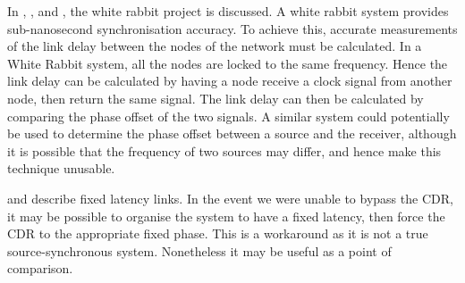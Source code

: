 \noindent In \cite{serrano2013white}, \cite{moreira2010digital}, and
\cite{moreira2009white}, the white rabbit project is discussed. A white rabbit
system provides sub-nanosecond synchronisation accuracy. To achieve this,
accurate measurements of the link delay between the nodes of the network must
be calculated.  In a White Rabbit system, all the nodes are locked to the same
frequency. Hence the link delay can be calculated by having a node receive a
clock signal from another node, then return the same signal. The link delay can
then be calculated by comparing the phase offset of the two signals.
A similar system could potentially be used to determine the phase offset
between a source and the receiver, although it is possible that the frequency
of two sources may differ, and hence make this technique unusable.

\noindent \cite{chen2017optimization} and \cite{fixed_latency} describe fixed
latency links. In the event we were unable to bypass the CDR, it may be
possible to organise the system to have a fixed latency, then force the CDR to
the appropriate fixed phase. This is a workaround as it is not a true
source-synchronous system. Nonetheless it may be useful as a point of
comparison. 
